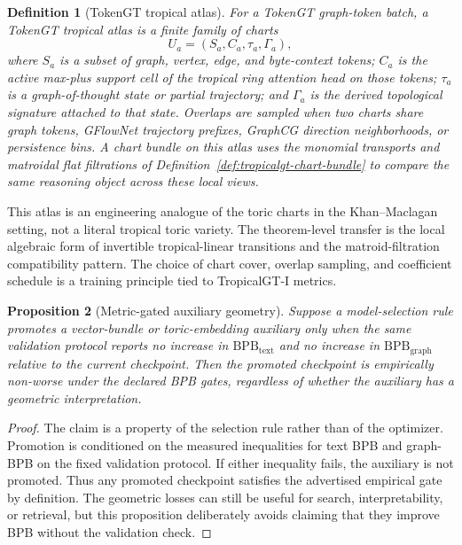 \documentclass[11pt]{article}
\newtheorem{definition}{Definition}[section]
\newtheorem{proposition}[definition]{Proposition}
\begin{document}
\begin{definition}[TokenGT tropical atlas]
\label{def:tokengt-tropical-atlas}
For a TokenGT graph-token batch, a TokenGT tropical atlas is a finite family of charts
\[
  U_a=(S_a, C_a, \tau_a, \Gamma_a),
\]
where $S_a$ is a subset of graph, vertex, edge, and byte-context tokens; $C_a$ is the active max-plus support cell of the tropical ring attention head on those tokens; $\tau_a$ is a graph-of-thought state or partial trajectory; and $\Gamma_a$ is the derived topological signature attached to that state.  Overlaps are sampled when two charts share graph tokens, GFlowNet trajectory prefixes, GraphCG direction neighborhoods, or persistence bins.  A chart bundle on this atlas uses the monomial transports and matroidal flat filtrations of Definition~\ref{def:tropicalgt-chart-bundle} to compare the same reasoning object across these local views.
\end{definition}

This atlas is an engineering analogue of the toric charts in the Khan--Maclagan setting, not a literal tropical toric variety.  The theorem-level transfer is the local algebraic form of invertible tropical-linear transitions and the matroid-filtration compatibility pattern.  The choice of chart cover, overlap sampling, and coefficient schedule is a training principle tied to TropicalGT-I metrics.

\begin{proposition}[Metric-gated auxiliary geometry]
Suppose a model-selection rule promotes a vector-bundle or toric-embedding auxiliary only when the same validation protocol reports no increase in $\mathrm{BPB}_{\mathrm{text}}$ and no increase in $\mathrm{BPB}_{\mathrm{graph}}$ relative to the current checkpoint.  Then the promoted checkpoint is empirically non-worse under the declared BPB gates, regardless of whether the auxiliary has a geometric interpretation.
\end{proposition}

\begin{proof}
The claim is a property of the selection rule rather than of the optimizer.  Promotion is conditioned on the measured inequalities for text BPB and graph-BPB on the fixed validation protocol.  If either inequality fails, the auxiliary is not promoted.  Thus any promoted checkpoint satisfies the advertised empirical gate by definition.  The geometric losses can still be useful for search, interpretability, or retrieval, but this proposition deliberately avoids claiming that they improve BPB without the validation check.
\end{proof}
\end{document}
